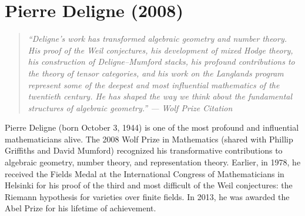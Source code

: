 \let\R\relax
\newcommand{\R}{\mathbb{R}}
\let\N\relax
\newcommand{\N}{\mathbb{N}}
\let\Z\relax
\newcommand{\Z}{\mathbb{Z}}
\let\Q\relax
\newcommand{\Q}{\mathbb{Q}}
\let\F\relax
\newcommand{\F}{\mathbb{F}}
\let\A\relax
\newcommand{\A}{\mathbb{A}}
\let\G\relax
\newcommand{\G}{\mathbb{G}}
\let\Spec\relax
\newcommand{\Spec}{\operatorname{Spec}}
\let\Proj\relax
\newcommand{\Proj}{\operatorname{Proj}}
\let\Gal\relax
\newcommand{\Gal}{\operatorname{Gal}}
\let\GL\relax
\newcommand{\GL}{\operatorname{GL}}
\let\SL\relax
\newcommand{\SL}{\operatorname{SL}}
\let\SO\relax
\newcommand{\SO}{\operatorname{SO}}
\let\PGL\relax
\newcommand{\PGL}{\operatorname{PGL}}
\let\Hom\relax
\newcommand{\Hom}{\operatorname{Hom}}
\let\Ext\relax
\newcommand{\Ext}{\operatorname{Ext}}
\let\End\relax
\newcommand{\End}{\operatorname{End}}
\let\Aut\relax
\newcommand{\Aut}{\operatorname{Aut}}
\let\Pic\relax
\newcommand{\Pic}{\operatorname{Pic}}
\let\Sym\relax
\newcommand{\Sym}{\operatorname{Sym}}
\let\Lie\relax
\newcommand{\Lie}{\operatorname{Lie}}
\let\ad\relax
\newcommand{\ad}{\operatorname{ad}}
\let\Gr\relax
\newcommand{\Gr}{\operatorname{Gr}}
\let\Fil\relax
\newcommand{\Fil}{\operatorname{Fil}}
\let\W\relax
\newcommand{\W}{\operatorname{W}}
\let\M\relax
\newcommand{\M}{\operatorname{M}}
\let\Frob\relax
\newcommand{\Frob}{\operatorname{Frob}}

\chapter{Pierre Deligne (2008)}

\begin{quote}
\it ``Deligne's work has transformed algebraic geometry and number theory. His proof of the Weil conjectures, his development of mixed Hodge theory, his construction of Deligne--Mumford stacks, his profound contributions to the theory of tensor categories, and his work on the Langlands program represent some of the deepest and most influential mathematics of the twentieth century. He has shaped the way we think about the fundamental structures of algebraic geometry.'' --- Wolf Prize Citation
\end{quote}

Pierre Deligne (born October 3, 1944) is one of the most profound and influential mathematicians alive. The 2008 Wolf Prize in Mathematics (shared with Phillip Griffiths and David Mumford) recognized his transformative contributions to algebraic geometry, number theory, and representation theory. Earlier, in 1978, he received the Fields Medal at the International Congress of Mathematicians in Helsinki for his proof of the third and most difficult of the Weil conjectures: the Riemann hypothesis for varieties over finite fields. In 2013, he was awarded the Abel Prize for his lifetime of achievement.

